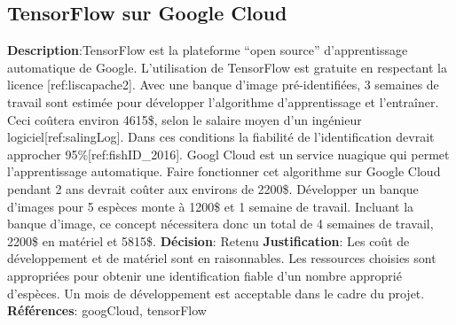 

\subsection{TensorFlow sur Google Cloud}
\label{s:identifier_conc1}

\textbf{Description}:TensorFlow est la plateforme “open source” d'apprentissage automatique de Google. L’utilisation de TensorFlow est gratuite en respectant la licence [ref:liscapache2]. Avec une banque d’image pré-identifiées, 3 semaines de travail sont estimée pour développer l'algorithme d’apprentissage et l’entraîner. Ceci coûtera environ 4615\$, selon le salaire moyen d’un ingénieur logiciel[ref:salingLog]. Dans ces conditions la fiabilité de l’identification devrait approcher 95\%[ref:fishID_2016]. Googl Cloud est un service nuagique qui permet l’apprentissage automatique. Faire fonctionner cet algorithme sur Google Cloud pendant 2 ans devrait coûter aux environs de 2200\$. Développer un banque d’images pour 5 espèces monte à 1200\$ et 1 semaine de travail. Incluant la banque d’image, ce concept nécessitera donc un total de 4 semaines de travail, 2200\$ en matériel et 5815\$.
\textbf{Décision}: Retenu
\textbf{Justification}: Les coût de développement et de matériel sont en raisonnables. Les ressources choisies sont appropriées pour obtenir une identification fiable d’un nombre approprié d’espèces. Un mois de développement est acceptable dans le cadre du projet.
\textbf{Références}: googCloud, tensorFlow